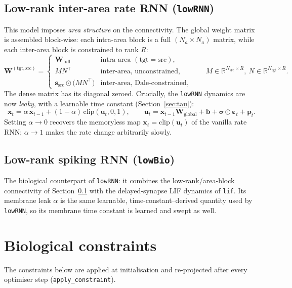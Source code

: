 \documentclass[11pt]{article}
\newcommand{\clip}{\mathrm{clip}}
\newcommand{\Wmat}{\mathbf{W}}
\newcommand{\xvec}{\mathbf{x}}
\newcommand{\code}[1]{\texttt{#1}}
\begin{document}
\subsection{Low-rank inter-area rate RNN (\code{lowRNN})}
\label{sec:lowrnn}
This model imposes \emph{area structure} on the connectivity. The global weight
matrix is assembled block-wise: each intra-area block is a full $(N_a \times N_a)$
matrix, while each inter-area block is constrained to rank $R$:
\begin{equation}
\Wmat^{(\mathrm{tgt},\mathrm{src})} =
\begin{cases}
\Wmat_{\text{full}} & \text{intra-area } (\mathrm{tgt}=\mathrm{src}),\\[2pt]
M N^{\top} & \text{inter-area, unconstrained},\\[2pt]
\mathbf{s}_{\mathrm{src}}\odot\big(M N^{\top}\big) & \text{inter-area, Dale-constrained},
\end{cases}
\qquad M \in \mathbb{R}^{N_{\mathrm{src}}\times R},\ N \in \mathbb{R}^{N_{\mathrm{tgt}}\times R}.
\end{equation}
The dense matrix has its diagonal zeroed. Crucially, the \code{lowRNN} dynamics
are now \emph{leaky}, with a learnable time constant (Section~\ref{sec:tau}):
\begin{equation}
\xvec_t = \alpha\,\xvec_{t-1} + (1-\alpha)\,\clip(\mathbf{u}_t, 0, 1),
\qquad
\mathbf{u}_t = \xvec_{t-1}\Wmat_{\text{global}} + \mathbf{b} + \boldsymbol{\sigma}\odot\boldsymbol{\varepsilon}_t + \mathbf{p}_t.
\label{eq:lowrnn-leaky}
\end{equation}
Setting $\alpha \to 0$ recovers the memoryless map $\xvec_t = \clip(\mathbf{u}_t)$
of the vanilla rate RNN; $\alpha \to 1$ makes the rate change arbitrarily slowly.

\subsection{Low-rank spiking RNN (\code{lowBio})}
The biological counterpart of \code{lowRNN}: it combines the low-rank/area-block
connectivity of Section~\ref{sec:lowrnn} with the delayed-synapse LIF dynamics of
\code{lif}. Its membrane leak $\alpha$ is the same learnable, time-constant--derived
quantity used by \code{lowRNN}, so its membrane time constant is learned and
swept as well.

\section{Biological constraints}
The constraints below are applied at initialisation and re-projected after every
optimiser step (\code{apply\_constraint}).
\end{document}
